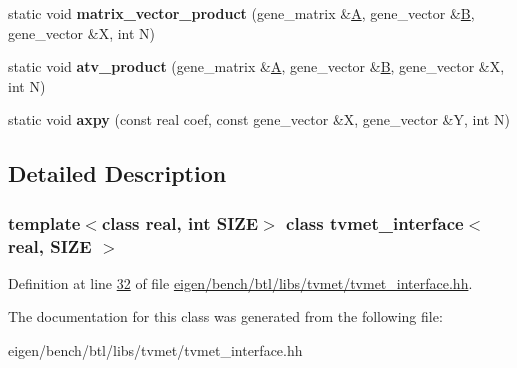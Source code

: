 \begin{DoxyCompactItemize}
static void {\bfseries matrix\+\_\+vector\+\_\+product} (gene\+\_\+matrix \&\hyperlink{group___core___module_class_eigen_1_1_matrix}{A}, gene\+\_\+vector \&\hyperlink{group___core___module_class_eigen_1_1_matrix}{B}, gene\+\_\+vector \&X, int N)
\item 
\mbox{\label{classtvmet__interface_a81f982aac7370b0b7bb9fd8d70982e36}} 
static void {\bfseries atv\+\_\+product} (gene\+\_\+matrix \&\hyperlink{group___core___module_class_eigen_1_1_matrix}{A}, gene\+\_\+vector \&\hyperlink{group___core___module_class_eigen_1_1_matrix}{B}, gene\+\_\+vector \&X, int N)
\item 
\mbox{\label{classtvmet__interface_ad66cc3890a0d80b5fdbc78bffeb00af3}} 
static void {\bfseries axpy} (const real coef, const gene\+\_\+vector \&X, gene\+\_\+vector \&Y, int N)
\end{DoxyCompactItemize}


\subsection{Detailed Description}
\subsubsection*{template$<$class real, int S\+I\+ZE$>$\newline
class tvmet\+\_\+interface$<$ real, S\+I\+Z\+E $>$}



Definition at line \hyperlink{eigen_2bench_2btl_2libs_2tvmet_2tvmet__interface_8hh_source_l00032}{32} of file \hyperlink{eigen_2bench_2btl_2libs_2tvmet_2tvmet__interface_8hh_source}{eigen/bench/btl/libs/tvmet/tvmet\+\_\+interface.\+hh}.



The documentation for this class was generated from the following file\+:\begin{DoxyCompactItemize}
\item 
eigen/bench/btl/libs/tvmet/tvmet\+\_\+interface.\+hh\end{DoxyCompactItemize}

